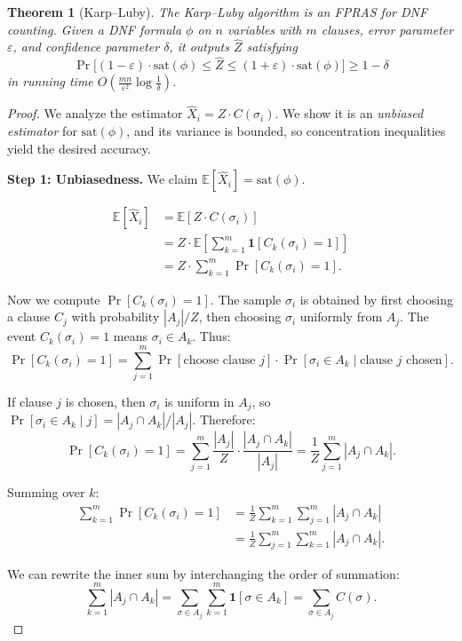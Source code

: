 \documentclass[twoside,12pt]{book}
\theoremstyle{plain}
\newtheorem{theorem}{Theorem}[chapter]
\theoremstyle{definition}
\theoremstyle{remark}
\begin{document}
\begin{theorem}[Karp--Luby]
\label{thm:karpluby}
The Karp--Luby algorithm is an FPRAS for DNF counting. Given a DNF formula $\phi$ on $n$ variables with $m$ clauses, error parameter $\varepsilon$, and confidence parameter $\delta$, it outputs $\hat{Z}$ satisfying
\[
\Pr\!\bigl[(1 - \varepsilon) \cdot \text{sat}(\phi) \leq \hat{Z} \leq (1 + \varepsilon) \cdot \text{sat}(\phi)\bigr] \geq 1 - \delta
\]
in running time $O\!\left(\frac{mn}{\varepsilon^2} \log \frac{1}{\delta}\right)$.
\end{theorem}

\begin{proof}
We analyze the estimator $\hat{X}_i = Z \cdot C(\sigma_i)$. We show it is an \emph{unbiased estimator} for $\text{sat}(\phi)$, and its variance is bounded, so concentration inequalities yield the desired accuracy.

\textbf{Step 1: Unbiasedness.} We claim $\mathbb{E}[\hat{X}_i] = \text{sat}(\phi)$.

\begin{align*}
\mathbb{E}[\hat{X}_i]
&= \mathbb{E}[Z \cdot C(\sigma_i)] \\
&= Z \cdot \mathbb{E}\!\left[ \sum_{k=1}^m \mathbf{1}[C_k(\sigma_i) = 1] \right] \\
&= Z \cdot \sum_{k=1}^m \Pr[C_k(\sigma_i) = 1].
\end{align*}

Now we compute $\Pr[C_k(\sigma_i) = 1]$. The sample $\sigma_i$ is obtained by first choosing a clause $C_j$ with probability $|A_j|/Z$, then choosing $\sigma_i$ uniformly from $A_j$. The event $C_k(\sigma_i) = 1$ means $\sigma_i \in A_k$. Thus:
\[
\Pr[C_k(\sigma_i) = 1] = \sum_{j=1}^m \Pr[\text{choose clause } j] \cdot \Pr[\sigma_i \in A_k \mid \text{clause } j \text{ chosen}].
\]

If clause $j$ is chosen, then $\sigma_i$ is uniform in $A_j$, so $\Pr[\sigma_i \in A_k \mid j] = |A_j \cap A_k| / |A_j|$. Therefore:
\[
\Pr[C_k(\sigma_i) = 1] = \sum_{j=1}^m \frac{|A_j|}{Z} \cdot \frac{|A_j \cap A_k|}{|A_j|} = \frac{1}{Z} \sum_{j=1}^m |A_j \cap A_k|.
\]

Summing over $k$:
\begin{align*}
\sum_{k=1}^m \Pr[C_k(\sigma_i) = 1]
&= \frac{1}{Z} \sum_{k=1}^m \sum_{j=1}^m |A_j \cap A_k| \\
&= \frac{1}{Z} \sum_{j=1}^m \sum_{k=1}^m |A_j \cap A_k|.
\end{align*}

We can rewrite the inner sum by interchanging the order of summation:
\[
\sum_{k=1}^m |A_j \cap A_k| = \sum_{\sigma \in A_j} \sum_{k=1}^m \mathbf{1}[\sigma \in A_k] = \sum_{\sigma \in A_j} C(\sigma).
\]


\end{proof}
\end{document}
